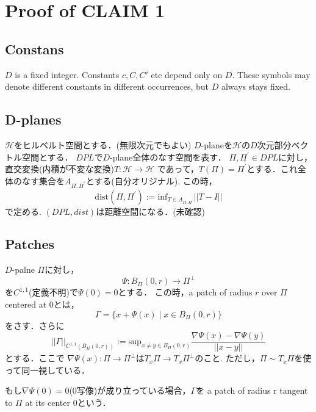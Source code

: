 \documentclass{ujarticle}
\newcommand{\bpd}{B_{\Pi}(0,r)}
\newcommand{\gnd}{||\Gamma||_{C^{1,1}(\bpd)}}
\begin{document}
\section{Proof of CLAIM 1}
\label{sec:Proof of CLAIM 1}

\subsection{Constans}
\label{sub:Constans}
$D$ is a fixed integer. Constants $c,C,C\prime$ etc depend only on $D$. These symbols may denote
different constants in different occurrences, but $D$ always stays fixed.

\subsection{D-planes}
\label{sub:D-planes}
$\mathcal{H}$をヒルベルト空間とする．(無限次元でもよい)
$D$-planeを$\mathcal{H}$の$D$次元部分ベクトル空間とする．
$DPL$で$D$-plane全体のなす空間を表す．
$\Pi,\Pi^\prime \in DPL$に対し，直交変換(内積が不変な変換)$T: \mathcal{H} \to \mathcal{H}$
であって，$T(\Pi)= \Pi^\prime$とする．これ全体のなす集合を$A_{\Pi,\Pi^\prime}$とする(自分オリジナル).
この時，
\begin{equation*}
 \mathrm{dist} (\Pi,\Pi^\prime):= \mathrm{inf}_{T \in A_{\Pi,\Pi^\prime}} ||T -I||
\end{equation*}
で定める.
$(DPL,dist)$は距離空間になる．(未確認)

\subsection{Patches}
\label{sub:Patches}
$D$-palne $\Pi$に対し，
\begin{equation*}
 \Psi :\bpd \to \Pi^{\perp}
\end{equation*}
を$C^{1,1}$(定義不明)で$\Psi(0)=0$とする．
この時，a patch of radius $r$ over $\Pi$ centered at 0とは，
\begin{equation*}
 \Gamma=\{ x + \Psi(x) \mid x \in \bpd \}
\end{equation*}
をさす．さらに
\begin{equation*}
 \gnd := \mathrm{sup}_{x \neq y \in \bpd} \frac{ \nabla \Psi(x) - \nabla \Psi(y)}{||x - y||}
\end{equation*}
とする．ここで
$\nabla\Psi(x):\Pi \to \Pi^{\perp}$は$T_x\Pi \to T_x\Pi^{\perp}$のこと.
ただし，$\Pi \sim T_x \Pi$を使って同一視している．

もし$ \nabla \Psi(0)=0$(0写像)が成り立っている場合，$\Gamma$を
a patch of radius r tangent to $\Pi$ at its center 0という．
\end{document}
